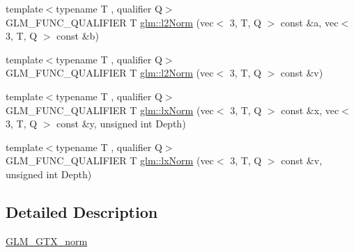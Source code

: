 \begin{DoxyCompactItemize}
\item 
{\footnotesize template$<$typename T , qualifier Q$>$ }\\G\+L\+M\+\_\+\+F\+U\+N\+C\+\_\+\+Q\+U\+A\+L\+I\+F\+I\+ER T \hyperlink{group__gtx__norm_ga41340b2ef40a9307ab0f137181565168}{glm\+::l2\+Norm} (vec$<$ 3, T, Q $>$ const \&a, vec$<$ 3, T, Q $>$ const \&b)
\item 
{\footnotesize template$<$typename T , qualifier Q$>$ }\\G\+L\+M\+\_\+\+F\+U\+N\+C\+\_\+\+Q\+U\+A\+L\+I\+F\+I\+ER T \hyperlink{group__gtx__norm_gae288bde8f0e41fb4ed62e65137b18cba}{glm\+::l2\+Norm} (vec$<$ 3, T, Q $>$ const \&v)
\item 
{\footnotesize template$<$typename T , qualifier Q$>$ }\\G\+L\+M\+\_\+\+F\+U\+N\+C\+\_\+\+Q\+U\+A\+L\+I\+F\+I\+ER T \hyperlink{group__gtx__norm_gacad23d30497eb16f67709f2375d1f66a}{glm\+::lx\+Norm} (vec$<$ 3, T, Q $>$ const \&x, vec$<$ 3, T, Q $>$ const \&y, unsigned int Depth)
\item 
{\footnotesize template$<$typename T , qualifier Q$>$ }\\G\+L\+M\+\_\+\+F\+U\+N\+C\+\_\+\+Q\+U\+A\+L\+I\+F\+I\+ER T \hyperlink{group__gtx__norm_gac61b6d81d796d6eb4d4183396a19ab91}{glm\+::lx\+Norm} (vec$<$ 3, T, Q $>$ const \&v, unsigned int Depth)
\end{DoxyCompactItemize}


\subsection{Detailed Description}
\hyperlink{group__gtx__norm}{G\+L\+M\+\_\+\+G\+T\+X\+\_\+norm} 